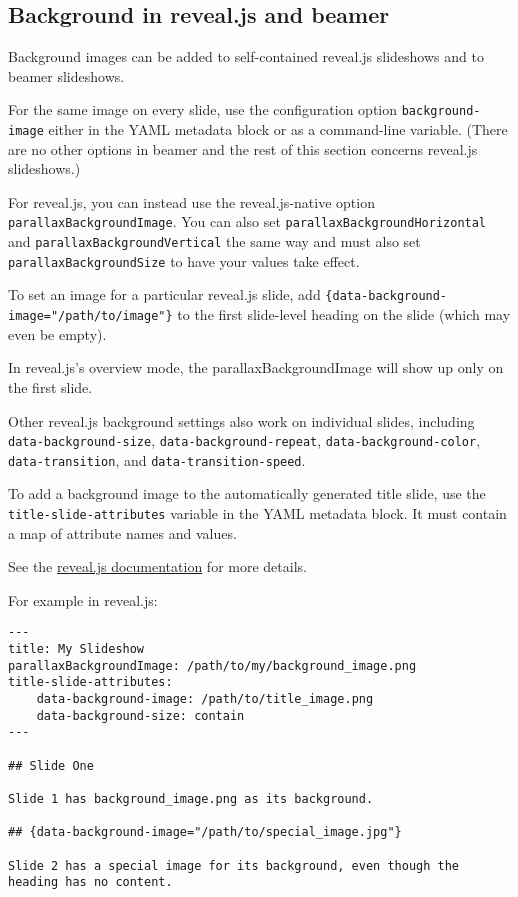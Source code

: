 \documentclass[]{article}
\begin{document}
\hypertarget{background-in-reveal.js-and-beamer}{%
\subsection{Background in reveal.js and
beamer}\label{background-in-reveal.js-and-beamer}}

Background images can be added to self-contained reveal.js slideshows
and to beamer slideshows.

For the same image on every slide, use the configuration option
\texttt{background-image} either in the YAML metadata block or as a
command-line variable. (There are no other options in beamer and the
rest of this section concerns reveal.js slideshows.)

For reveal.js, you can instead use the reveal.js-native option
\texttt{parallaxBackgroundImage}. You can also set
\texttt{parallaxBackgroundHorizontal} and
\texttt{parallaxBackgroundVertical} the same way and must also set
\texttt{parallaxBackgroundSize} to have your values take effect.

To set an image for a particular reveal.js slide, add
\texttt{\{data-background-image="/path/to/image"\}} to the first
slide-level heading on the slide (which may even be empty).

In reveal.js's overview mode, the parallaxBackgroundImage will show up
only on the first slide.

Other reveal.js background settings also work on individual slides,
including \texttt{data-background-size},
\texttt{data-background-repeat}, \texttt{data-background-color},
\texttt{data-transition}, and \texttt{data-transition-speed}.

To add a background image to the automatically generated title slide,
use the \texttt{title-slide-attributes} variable in the YAML metadata
block. It must contain a map of attribute names and values.

See the \href{https://revealjs.com/backgrounds/}{reveal.js
documentation} for more details.

For example in reveal.js:

\begin{verbatim}
---
title: My Slideshow
parallaxBackgroundImage: /path/to/my/background_image.png
title-slide-attributes:
    data-background-image: /path/to/title_image.png
    data-background-size: contain
---

## Slide One

Slide 1 has background_image.png as its background.

## {data-background-image="/path/to/special_image.jpg"}

Slide 2 has a special image for its background, even though the heading has no content.
\end{verbatim}
\end{document}

